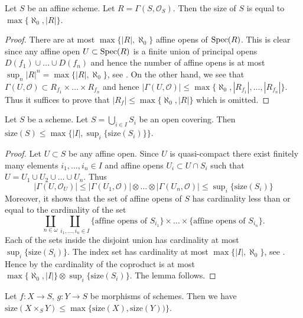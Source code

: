 \begin{lemma}
\label{lemma-bound-affine}
Let $S$ be an affine scheme.
Let $R = \Gamma(S, \mathcal{O}_S)$.
Then the size of $S$ is equal to $\max\{ \aleph_0, |R|\}$.
\end{lemma}

\begin{proof}
There are at most $\max\{|R|, \aleph_0\}$ affine opens of
$\mathop{\rm Spec}(R)$. This is clear since any affine open
$U \subset \mathop{\rm Spec}(R)$ is a finite union of principal
opens $D(f_1) \cup \ldots \cup D(f_n)$ and hence the number
of affine opens is at most $\sup_n |R|^n = \max\{|R|, \aleph_0\}$,
see \cite[Ch. I, 10.13]{Kunen}. On the other hand, we see that
$\Gamma(U, \mathcal{O}) \subset R_{f_1} \times \ldots \times R_{f_n}$
and hence $|\Gamma(U, \mathcal{O})| \leq
\max\{\aleph_0, |R_{f_1}|, \ldots, |R_{f_n}|\}$. Thus
it suffices to prove that $|R_f| \leq \max\{\aleph_0, |R|\}$
which is omitted.
\end{proof}

\begin{lemma}
\label{lemma-bound-size}
Let $S$ be a scheme. Let $S = \bigcup_{i \in I} S_i$ be
an open covering. Then
$\text{size}(S) \leq \max\{|I|, \sup_i\{\text{size}(S_i)\}\}$.
\end{lemma}

\begin{proof}
Let $U \subset S$ be any affine open. Since $U$ is quasi-compact
there exist finitely many elements $i_1, \ldots, i_n \in I$
and affine opens $U_i \subset U \cap S_i$ such that
$U = U_1 \cup U_2 \cup \ldots \cup U_n$. Thus
$$
|\Gamma(U, \mathcal{O}_U)|
\leq
|\Gamma(U_1, \mathcal{O})|
\otimes
\ldots
\otimes
|\Gamma(U_n, \mathcal{O})|
\leq \sup\nolimits_i\{\text{size}(S_i)\}
$$
Moreover, it shows that the set of affine opens of $S$ has
cardinality less than or equal to the cardinality of the set
$$
\coprod_{n \in \omega}
\coprod_{i_1, \ldots, i_n \in I}
\{\text{affine opens of }S_{i_1}\}
\times
\ldots
\times
\{\text{affine opens of }S_{i_n}\}.
$$
Each of the sets inside the disjoint union has cardinality at most
$\sup_i\{\text{size}(S_i)\}$. The index set has cardinality at most
$\max\{|I|, \aleph_0\}$, see \cite[Ch. I, 10.13]{Kunen}.
Hence by \cite[Lemma 5.8]{Jech} the cardinality
of the coproduct is at most $\max\{\aleph_0, |I|\}
\otimes \sup_i\{\text{size}(S_i)\}$. The lemma follows.
\end{proof}

\begin{lemma}
\label{lemma-bound-size-fibre-product}
Let $f : X \to S$, $g : Y \to S$ be morphisms of schemes.
Then we have
$\text{size}(X \times_S Y) \leq \max\{\text{size}(X), \text{size}(Y))\}$.
\end{lemma}


